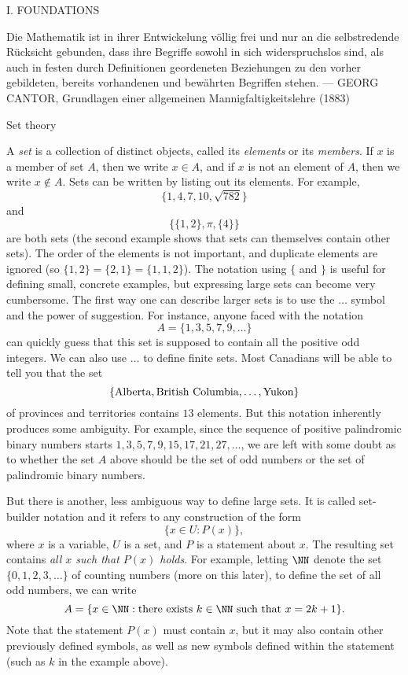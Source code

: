 \vfill\eject
\begingroup\headline{\hfil}\footline{\hfil}
\centerline{\titlefont I. FOUNDATIONS}
\vskip220pt
\bigskip
\begingroup\obeylines\eightssi
\hfill Die Mathematik ist in ihrer Entwickelung v\"ollig frei
\hfill und nur an die selbstredende R\"ucksicht gebunden,
\hfill dass ihre Begriffe sowohl in sich widerspruchslos sind,
\hfill als auch in festen durch Definitionen geordeneten Beziehungen
\hfill zu den vorher gebildeten,
\hfill bereits vorhandenen und bew\"ahrten Begriffen stehen.
\eightss
\smallskip
\hfill --- GEORG CANTOR, {\eightssi Grundlagen einer allgemeinen Mannigfaltigkeits­lehre} (1883)
\endgroup%
\bigskip\goodbreak
\vfill\eject

\advsect Set theory

A {\it set} is a collection of distinct objects, called its {\it elements} or its {\it members}. If
$x$ is a member of set $A$, then we write $x\in A$, and if $x$ is not an element of $A$,
then we write $x\notin A$.
Sets can be written by listing out its elements. For example,
$$\bigl\{1,4,7,10,\sqrt{782}\bigr\}$$
and
$$\bigl\{\{1,2\}, \pi, \{4\}\bigr\}$$
are both sets (the second example shows that sets can themselves contain other sets). The order of the elements
is not important, and duplicate elements are ignored (so $\{1,2\} = \{2,1\} = \{1,1,2\}$).
The notation using $\{$ and $\}$
is useful for defining small, concrete examples, but expressing large sets can become
very cumbersome. The first way one can describe larger sets is to use the $\ldots$ symbol and the power of
suggestion. For instance, anyone faced with the notation
$$A = \{1,3,5,7,9,\ldots\}$$
can quickly guess that this set is supposed to contain all the positive odd integers. We can also use $\ldots$
to define finite sets. Most Canadians will be able to tell you that the set
$$\{\hbox{\rm Alberta}, \hbox{\rm British Columbia}, \ldots, \hbox{\rm Yukon}\}$$
of provinces and territories contains $13$ elements.
But this notation inherently produces some ambiguity. For example, since the sequence of positive palindromic
binary numbers starts $1,3,5,7,9,15,17,21,27,\ldots$,
we are left with some doubt as to whether the set $A$ above should be the set of odd numbers or the set of
palindromic binary numbers.

But there is another, less ambiguous way to define large sets. It is called set-builder notation
and it refers to any construction of the form
$$\bigl\{x \in U : P(x)\bigr\},$$
where $x$ is a variable, $U$ is a set,
and $P$ is a statement about $x$. The resulting set contains {\sl all $x$ such that $P(x)$
holds}. For example, letting $\NN$ denote the set $\{0,1,2,3,\ldots\}$ of counting numbers (more on this later),
to define the set of all odd numbers, we can write
$$A = \{ x\in \NN : \hbox{there exists}\ k\in \NN\ \hbox{such that}\ x = 2k + 1\}.$$
Note that the statement $P(x)$ must contain $x$, but it may also contain other previously defined symbols, as well
as new symbols defined within the statement (such as $k$ in the example above).

